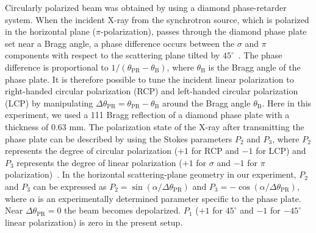 \documentclass[aps,prb,reprint,superscriptaddress,amsmath,amssymb]{revtex4-2}
\begin{document}
Circularly polarized beam was obtained by using a diamond phase-retarder system. 
When the incident X-ray from the synchrotron source, which is polarized in the horizontal plane ($\pi$-polarization), passes through the diamond phase plate set near a Bragg angle, a phase difference occurs between the $\sigma$ and $\pi$ components with respect to the scattering plane tilted by $45^{\circ}$~\cite{Hirano95}.
The phase difference is proportional to $1/(\theta_{\text{PR}} - \theta_{\text{B}})$, where $\theta_{\text{B}}$ is the Bragg angle of the phase plate. 
It is therefore possible to tune the incident linear polarization to right-handed circular polarization (RCP) and left-handed circular polarization (LCP) by manipulating $\Delta\theta_{\text{PR}} = \theta_{\text{PR}} - \theta_{\text{B}}$ around the Bragg angle $\theta_{\text{B}}$. 
Here in this experiment, we used a 111 Bragg reflection of a diamond phase plate with a thickness of 0.63 mm. 
The polarization state of the X-ray after transmitting the phase plate can be described by using the Stokes parameters $P_2$ and $P_3$, where $P_2$ represents the degree of circular polarization ($+1$ for RCP and $-1$ for LCP) and $P_3$ represents the degree of linear polarization ($+1$ for $\sigma$ and $-1$ for $\pi$ polarization)~\cite{Lovesey96}. 
In the horizontal scattering-plane geometry in our experiment, $P_2$ and $P_3$ can be expressed as $P_2= \sin (\alpha/\Delta\theta_{\text{PR}})$ and $P_3 = -\cos (\alpha/\Delta\theta_{\text{PR}})$, where $\alpha$ is an experimentally determined parameter specific to the phase plate. 
Near $\Delta\theta_{\text{PR}} = 0$ the beam becomes depolarized. 
$P_1$ ($+1$ for $45^{\circ}$ and $-1$ for $-45^{\circ}$ linear polarization) is zero in the present setup. 
\end{document}
